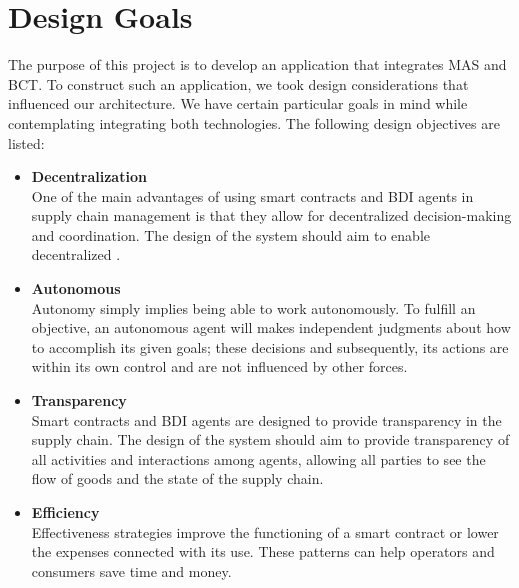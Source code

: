 \section{Design Goals}

The purpose of this project is to develop an application that integrates \ac{MAS} and \ac{BCT}. To construct such an application, we took design considerations that influenced our architecture. We have certain particular goals in mind while contemplating integrating both technologies. The following design objectives are listed:
\vspace{.5cm}
\begin{itemize}

    \item \textbf{Decentralization} \\ One of the main advantages of using smart contracts and \ac{BDI} agents in supply chain management is that they allow for decentralized decision-making and coordination. The design of the system should aim to enable decentralized .

    \vspace{.5cm}
    
    \item \textbf{Autonomous} \\Autonomy simply implies being able to work autonomously. To fulfill an objective, an autonomous agent will makes independent judgments about how to accomplish its given goals; these decisions and subsequently, its actions are within its own control and are not influenced by other forces.

    \vspace{.5cm}

    \item \textbf{Transparency} \\ Smart contracts and \ac{BDI} agents are designed to provide transparency in the supply chain. The design of the system should aim to provide transparency of all activities and interactions among agents, allowing all parties to see the flow of goods and the state of the supply chain.

    \vspace{.5cm}
    
    \item \textbf{Efficiency} \\
    Effectiveness strategies improve the functioning of a smart contract or lower the expenses connected with its use. These patterns can help operators and consumers save time and money.
    

\end{itemize}
